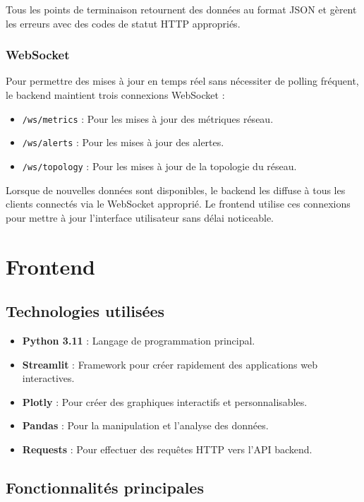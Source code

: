 \documentclass[12pt,a4paper]{report}
\begin{document}
Tous les points de terminaison retournent des données au format JSON et gèrent les erreurs avec des codes de statut HTTP appropriés.

\subsubsection{WebSocket}
Pour permettre des mises à jour en temps réel sans nécessiter de polling fréquent, le backend maintient trois connexions WebSocket :
\begin{itemize}
    \item \texttt{/ws/metrics} : Pour les mises à jour des métriques réseau.
    \item \texttt{/ws/alerts} : Pour les mises à jour des alertes.
    \item \texttt{/ws/topology} : Pour les mises à jour de la topologie du réseau.
\end{itemize}

Lorsque de nouvelles données sont disponibles, le backend les diffuse à tous les clients connectés via le WebSocket approprié. Le frontend utilise ces connexions pour mettre à jour l'interface utilisateur sans délai noticeable.

\section{Frontend}
\subsection{Technologies utilisées}
\begin{itemize}
    \item \textbf{Python 3.11} : Langage de programmation principal.
    \item \textbf{Streamlit} : Framework pour créer rapidement des applications web interactives.
    \item \textbf{Plotly} : Pour créer des graphiques interactifs et personnalisables.
    \item \textbf{Pandas} : Pour la manipulation et l'analyse des données.
    \item \textbf{Requests} : Pour effectuer des requêtes HTTP vers l'API backend.
\end{itemize}

\subsection{Fonctionnalités principales}
\end{document}
